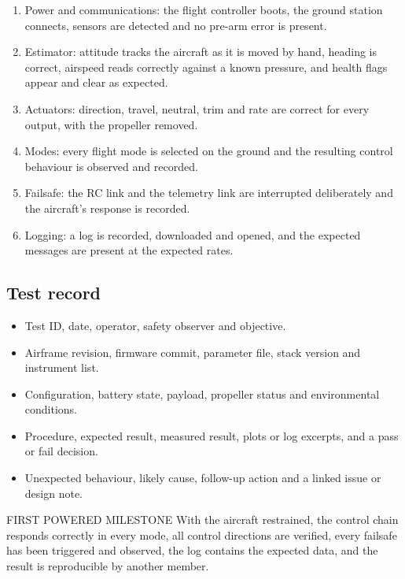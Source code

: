 \documentclass[11pt,a4paper]{article}
\begin{document}
\begin{enumerate}
  \item Power and communications: the flight controller boots, the ground station connects, sensors are detected and no pre-arm error is present.
  \item Estimator: attitude tracks the aircraft as it is moved by hand, heading is correct, airspeed reads correctly against a known pressure, and health flags appear and clear as expected.
  \item Actuators: direction, travel, neutral, trim and rate are correct for every output, with the propeller removed.
  \item Modes: every flight mode is selected on the ground and the resulting control behaviour is observed and recorded.
  \item Failsafe: the RC link and the telemetry link are interrupted deliberately and the aircraft's response is recorded.
  \item Logging: a log is recorded, downloaded and opened, and the expected messages are present at the expected rates.
\end{enumerate}

\subsection{Test record}

\begin{itemize}
  \item Test ID, date, operator, safety observer and objective.
  \item Airframe revision, firmware commit, parameter file, stack version and instrument list.
  \item Configuration, battery state, payload, propeller status and environmental conditions.
  \item Procedure, expected result, measured result, plots or log excerpts, and a pass or fail decision.
  \item Unexpected behaviour, likely cause, follow-up action and a linked issue or design note.
\end{itemize}

\begin{warningbox}{FIRST POWERED MILESTONE}
  With the aircraft restrained, the control chain responds correctly in every
  mode, all control directions are verified, every failsafe has been triggered
  and observed, the log contains the expected data, and the result is
  reproducible by another member.
\end{warningbox}
\end{document}
